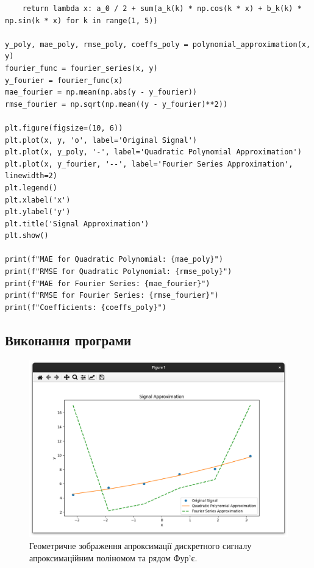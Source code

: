 \documentclass[oneside,14pt]{extarticle}
\begin{document}
\begin{normalsize}
{\begin{lstlisting}
    return lambda x: a_0 / 2 + sum(a_k(k) * np.cos(k * x) + b_k(k) * np.sin(k * x) for k in range(1, 5))

y_poly, mae_poly, rmse_poly, coeffs_poly = polynomial_approximation(x, y)
fourier_func = fourier_series(x, y)
y_fourier = fourier_func(x)
mae_fourier = np.mean(np.abs(y - y_fourier))
rmse_fourier = np.sqrt(np.mean((y - y_fourier)**2))

plt.figure(figsize=(10, 6))
plt.plot(x, y, 'o', label='Original Signal')
plt.plot(x, y_poly, '-', label='Quadratic Polynomial Approximation')
plt.plot(x, y_fourier, '--', label='Fourier Series Approximation', linewidth=2)
plt.legend()
plt.xlabel('x')
plt.ylabel('y')
plt.title('Signal Approximation')
plt.show()

print(f"MAE for Quadratic Polynomial: {mae_poly}")
print(f"RMSE for Quadratic Polynomial: {rmse_poly}")
print(f"MAE for Fourier Series: {mae_fourier}")
print(f"RMSE for Fourier Series: {rmse_fourier}")
print(f"Coefficients: {coeffs_poly}")\end{lstlisting}
	}
	
	\subsection*{Виконання програми}
	
	\begin{figure}[H]
		\centering
		\vspace{-30pt}
		\includegraphics[scale=0.48]{1}
		\vspace{-30pt}
		\caption{Геометричне зображення апроксимації дискретного сигналу апроксимаційним
поліномом та рядом Фур’є.}
	\end{figure}
	

\end{normalsize}
\end{document}
